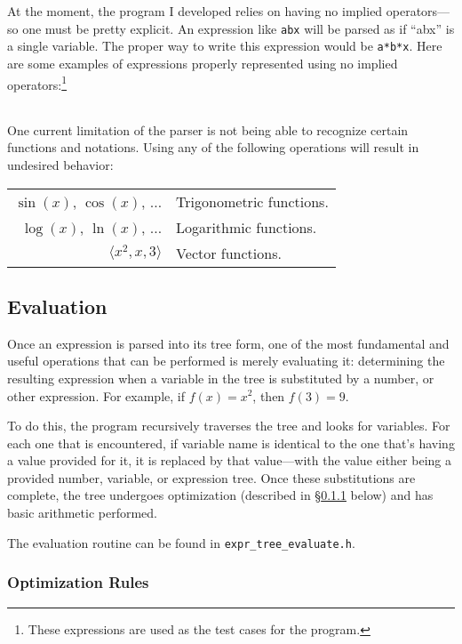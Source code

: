 \documentclass{article}
\begin{document}
At the moment, the program I developed relies on having no implied operators---so one must be pretty explicit. An expression like \verb|abx| will be parsed as if ``abx'' is a single variable. The proper way to write this expression would be \verb|a*b*x|. Here are some examples of expressions properly represented using no implied operators:\footnote{These expressions are used as the test cases for the program.}

\begin{tabular}{r c l}

\end{tabular}

\noindent One current limitation of the parser is not being able to recognize certain functions and notations. Using any of the following operations will result in undesired behavior:

\renewcommand{\arraystretch}{2}
\begin{tabular}{r l}
$\sin(x)$, $\cos(x)$, $\ldots$ & Trigonometric functions. \\
$\log(x)$, $\ln(x)$, $\ldots$ & Logarithmic functions. \\
$\langle x^2, x, 3 \rangle$ & Vector functions. \\
\end{tabular}


\subsection{Evaluation}
\label{evaluation}

Once an expression is parsed into its tree form, one of the most fundamental and useful operations that can be performed is merely evaluating it: determining the resulting expression when a variable in the tree is substituted by a number, or other expression. For example, if $f(x)=x^2$, then $f(3)=9$.

To do this, the program recursively traverses the tree and looks for variables. For each one that is encountered, if variable name is identical to the one that's having a value provided for it, it is replaced by that value---with the value either being a provided number, variable, or expression tree. Once these substitutions are complete, the tree undergoes optimization (described in \S\ref{optimization} below) and has basic arithmetic performed.

The evaluation routine can be found in \verb|expr_tree_evaluate.h|.

\subsubsection{Optimization Rules}
\label{optimization}
\end{document}

